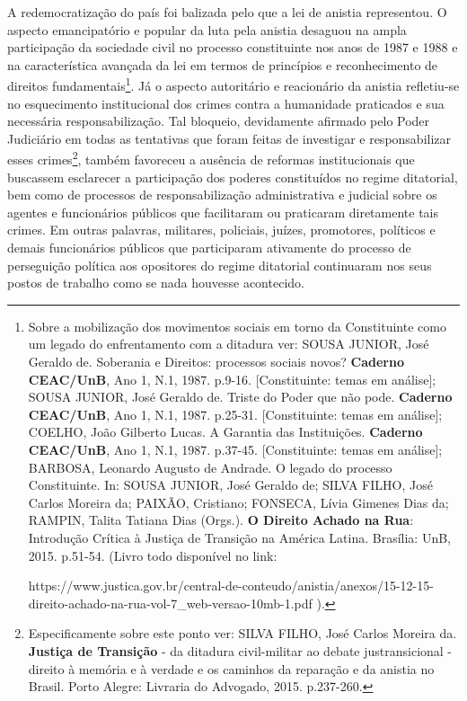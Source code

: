 A redemocratização do país foi balizada pelo que a lei de anistia
representou. O aspecto emancipatório e popular da luta pela anistia
desaguou na ampla participação da sociedade civil no processo
constituinte nos anos de 1987 e 1988 e na característica avançada da lei
em termos de princípios e reconhecimento de direitos
fundamentais\footnote{Sobre a mobilização dos movimentos sociais em
  torno da Constituinte como um legado do enfrentamento com a ditadura
  ver: SOUSA JUNIOR, José Geraldo de. Soberania e Direitos: processos
  sociais novos? \textbf{Caderno CEAC/UnB}, Ano 1, N.1, 1987. p.9-16.
  {[}Constituinte: temas em análise{]}; SOUSA JUNIOR, José Geraldo de.
  Triste do Poder que não pode. \textbf{Caderno CEAC/UnB}, Ano 1, N.1,
  1987. p.25-31. {[}Constituinte: temas em análise{]}; COELHO, João
  Gilberto Lucas. A Garantia das Instituições. \textbf{Caderno
  CEAC/UnB}, Ano 1, N.1, 1987. p.37-45. {[}Constituinte: temas em
  análise{]}; BARBOSA, Leonardo Augusto de Andrade. O legado do processo
  Constituinte. In: SOUSA JUNIOR, José Geraldo de; SILVA FILHO, José
  Carlos Moreira da; PAIXÃO, Cristiano; FONSECA, Lívia Gimenes Dias da;
  RAMPIN, Talita Tatiana Dias (Orgs.). \textbf{O Direito Achado na Rua}:
  Introdução Crítica à Justiça de Transição na América Latina. Brasília:
  UnB, 2015. p.51-54. (Livro todo disponível no link:

  https://www.justica.gov.br/central-de-conteudo/anistia/anexos/15-12-15-direito-achado-na-rua-vol-7\_web-versao-10mb-1.pdf
  ).}. Já o aspecto autoritário e reacionário da anistia refletiu-se no
esquecimento institucional dos crimes contra a humanidade praticados e
sua necessária responsabilização. Tal bloqueio, devidamente afirmado
pelo Poder Judiciário em todas as tentativas que foram feitas de
investigar e responsabilizar esses crimes\footnote{Especificamente sobre
  este ponto ver: SILVA FILHO, José Carlos Moreira da. \textbf{Justiça
  de Transição} - da ditadura civil-militar ao debate justransicional -
  direito à memória e à verdade e os caminhos da reparação e da anistia
  no Brasil. Porto Alegre: Livraria do Advogado, 2015. p.237-260.},
também favoreceu a ausência de reformas institucionais que buscassem
esclarecer a participação dos poderes constituídos no regime ditatorial,
bem como de processos de responsabilização administrativa e judicial
sobre os agentes e funcionários públicos que facilitaram ou praticaram
diretamente tais crimes. Em outras palavras, militares, policiais,
juízes, promotores, políticos e demais funcionários públicos que
participaram ativamente do processo de perseguição política aos
opositores do regime ditatorial continuaram nos seus postos de trabalho
como se nada houvesse acontecido.

